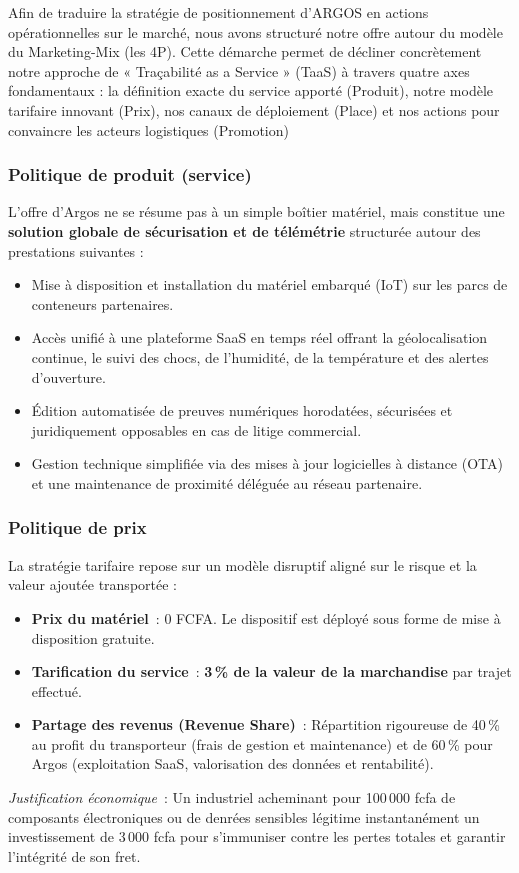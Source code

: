Afin de traduire la stratégie de positionnement d'ARGOS en actions opérationnelles sur le marché, nous avons structuré notre offre autour du modèle du Marketing-Mix (les 4P). Cette démarche permet de décliner concrètement notre approche de « Traçabilité as a Service » (TaaS) à travers quatre axes fondamentaux : la définition exacte du service apporté (Produit), notre modèle tarifaire innovant (Prix), nos canaux de déploiement (Place) et nos actions pour convaincre les acteurs logistiques (Promotion)

\subsubsection{Politique de produit (service)}
L'offre d'Argos ne se résume pas à un simple boîtier matériel, mais constitue une \textbf{solution globale de sécurisation et de télémétrie} structurée autour des prestations suivantes :
\begin{itemize}[label=\textcolor{argosblue}{\textbf{>}}]
    \item Mise à disposition et installation du matériel embarqué (IoT) sur les parcs de conteneurs partenaires.
    \item Accès unifié à une plateforme SaaS en temps réel offrant la géolocalisation continue, le suivi des chocs, de l'humidité, de la température et des alertes d'ouverture.
    \item Édition automatisée de preuves numériques horodatées, sécurisées et juridiquement opposables en cas de litige commercial.
    \item Gestion technique simplifiée via des mises à jour logicielles à distance (OTA) et une maintenance de proximité déléguée au réseau partenaire.
\end{itemize}

\subsubsection{Politique de prix}
La stratégie tarifaire repose sur un modèle disruptif aligné sur le risque et la valeur ajoutée transportée :
\begin{itemize}[label=\textcolor{argosblue}{\textbf{>}}]
    \item \textbf{Prix du matériel}~: 0 FCFA. Le dispositif est déployé sous forme de mise à disposition gratuite.
    \item \textbf{Tarification du service}~: \textbf{3\,\% de la valeur de la marchandise} par trajet effectué.
    \item \textbf{Partage des revenus (Revenue Share)}~: Répartition rigoureuse de 40\,\% au profit du transporteur (frais de gestion et maintenance) et de 60\,\% pour Argos (exploitation SaaS, valorisation des données et rentabilité).
\end{itemize}
\textit{Justification économique}~: Un industriel acheminant pour 100\,000 fcfa de composants électroniques ou de denrées sensibles légitime instantanément un investissement de 3\,000 fcfa pour s'immuniser contre les pertes totales et garantir l'intégrité de son fret.

